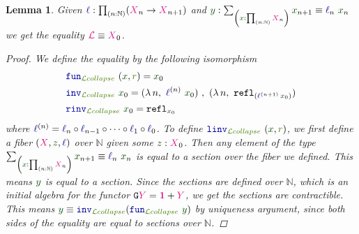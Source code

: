 \documentclass[twoside,11pt,openright]{report}
\theoremstyle{plain} %
\newtheorem{lem}[thm]{Lemma}
\theoremstyle{definition}
\theoremstyle{remark}
\newcommand*{\term}[1]{\textcolor{green!30!black}{#1}} %
\newcommand*{\pathterm}[1]{\textcolor{green!65!red!75!black}{#1}}
\newcommand*{\type}[1]{\textcolor{magenta!90!black}{#1}}
\newcommand*{\unit}{\type{\textbf{1}}}
\newcommand*{\function}[1]{\textcolor{blue!60!black}{\ensuremath{\mathtt{#1}}}}
\newcommand*{\functor}[1]{\ensuremath{\mathbf{\mathtt{#1}}}}
\begin{document}
\begin{lem}\label{lem:limit-collapse}
  Given \(\function{\ell} : \prod_{(n : \mathbb{N})} (\type{X}_{n} \rightarrow \type{X}_{n+1})\) and \(\term{y} : \sum_{\left(\term{x} : \prod_{(n : \mathbb{N})} \type{X}_n\right)} \term{x}_{n + 1} \equiv \function{\ell}_n~\term{x}_n\) we get the equality \(\type{\mathcal{L}} \equiv \type{X}_0\).
  \begin{proof}
    We define the equality by the following isomorphism
    \begin{align}
      &\function{fun}_{\pathterm{\mathcal{L}collapse}}~(\term{x} , \pathterm{r}) = \term{x}_0 \\
      &\function{inv}_{\pathterm{\mathcal{L}collapse}}~\term{x}_0 = (\lambda\,n,~\function{\ell}^{(n)}~\term{x}_0)~,~(\lambda\,n,~\mathtt{refl}_{(\function{\ell}^{(n+1)}\,\term{x}_0)}) \\
      &\function{rinv}_{\pathterm{\mathcal{L}collapse}}~\term{x}_0 = \mathtt{refl}_{\term{x}_0}
    \end{align}
    where \(\function{\ell}^{(n)} = \function{\ell}_n \circ \function{\ell}_{n-1} \circ \dots \circ \function{\ell}_1 \circ \function{\ell}_0\). To define \(\function{linv}_{\pathterm{\mathcal{L}collapse}}~(\term{x} , \pathterm{r})\), we first define a fiber \((\type{X} , \term{z}, \function{\ell})\) over \(\mathbb{N}\) given some \(\term{z} : \type{X}_0\). Then any element of the type \(\sum_{\left(\term{x} : \prod_{(n : \mathbb{N})} \type{X}_n\right)} \term{x}_{n + 1} \equiv \function{\ell}_n~\term{x}_n\) is equal to a section over the fiber we defined. This means \(\term{y}\) is equal to a section. Since the sections are defined over \(\mathbb{N}\), which is an initial algebra for the functor \(\functor{G}\type{Y} = \unit + \type{Y}\), we get the sections are contractible. This means \(\term{y} \equiv \function{inv}_{\pathterm{\mathcal{L}collapse}} (\function{fun}_{\pathterm{\mathcal{L}collapse}}~\term{y})\) by uniqueness argument, since both sides of the equality are equal to sections over \(\mathbb{N}\).
\end{proof}
\end{lem}
\end{document}
